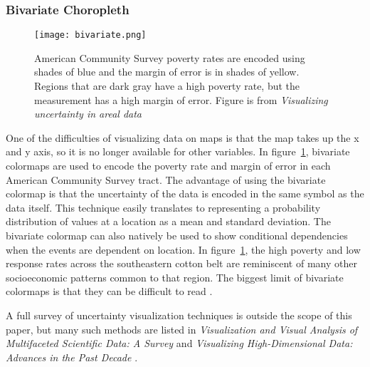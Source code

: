 \documentclass[../main.tex]{subfiles}
\begin{document}
\subsubsection{Bivariate Choropleth}
\begin{figure}[H]
\texttt{[image: bivariate.png]}
\caption{American Community Survey poverty rates are encoded using shades of blue and the margin of error is in shades of yellow. Regions that are dark gray have a high poverty rate, but the measurement has a high margin of error. Figure is from \textit{Visualizing uncertainty in areal data} \cite{lucchesi_visualizing_2017}}
\label{fig:bivariate}
\end{figure}
One of the difficulties of visualizing data on maps is that the map takes up the x and y axis, so it is no longer available for other variables. In figure~\ref{fig:bivariate}, bivariate colormaps \cite{trumbo_theory_1981,carstensen_hypothesis_1986} are used to encode the poverty rate and margin of error in each American Community Survey tract. The advantage of using the bivariate colormap is that the uncertainty of the data is encoded in the same symbol as the data itself. This technique easily translates to representing a probability distribution of values at a location as a mean and standard deviation. The bivariate colormap can also natively be used to show conditional dependencies when the events are dependent on location. In figure~\ref{fig:bivariate}, the high poverty and low response rates across the southeastern cotton belt are reminiscent of many other socioeconomic patterns common to that region. The biggest limit of bivariate colormaps is that they can be difficult to read \cite{carstensen_hypothesis_1986}.


A full survey of uncertainty visualization techniques is outside the scope of this paper, but many such methods are listed in \textit{Visualization and Visual Analysis of Multifaceted Scientific Data: A Survey} \cite{kehrer_visualization_2013} and \textit{Visualizing High-Dimensional Data: Advances in the Past Decade} \cite{liu_visualizing_2017}.
\end{document}

